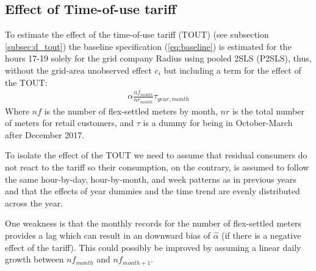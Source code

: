 \subsection{Effect of Time-of-use tariff}
\label{subsec:e_tout}
To estimate the effect of the time-of-use tariff (TOUT) (see subsection \ref{subsec:d_tout}) the baseline specification (\ref{eq:baseline}) is estimated for the hours 17-19 solely for the grid company Radius using pooled 2SLS (P2SLS), thus, without the grid-area unobserved effect $c_i$ but including a term for the effect of the TOUT:
\begin{align}
  \alpha\frac{nf_{month}}{nr_{month}}\tau_{year,month}
  \label{eq:tout}
\end{align}
Where $nf$ is the number of flex-settled meters by month, $nr$ is the total number of meters for retail customers, and $\tau$ is a dummy for being in October-March after December 2017.
\bigskip\par
To isolate the effect of the TOUT we need to assume that residual consumers do not react to the tariff so their consumption, on the contrary, is assumed to follow the same hour-by-day, hour-by-month, and week patterns as in previous years and that the effects of year dummies and the time trend are evenly distributed across the year.
\par
One weakness is that the monthly records for the number of flex-settled meters provides a lag which can result in an downward bias of $\widehat{\alpha}$ (if there is a negative effect of the tariff). This could possibly be improved by assuming a linear daily growth between $nf_{month}$ and $nf_{month+1}$.


